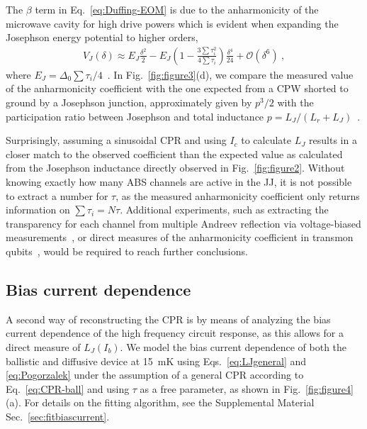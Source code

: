 The $\beta$ term in Eq.~\ref{eq:Duffing-EOM} is due to the anharmonicity of the microwave cavity for high drive powers which is evident when expanding the Josephson energy potential to higher orders,
\begin{align}
V_J(\delta) \approx E_J \frac{\delta^2}{2} - E_J\left( 1-\frac{3\sum\tau_i^2}{4\sum\tau_i} \right) \frac{\delta^4}{24} +\mathcal{O}(\delta^6)\ , 
\end{align}
%
where $E_J=\Delta_0\sum\tau_i/4$~\cite{kringhojAnharmonicitySuperconductingQubit2018}.
%
In Fig.~\ref{fig:figure3}(d), we compare the measured value of the anharmonicity coefficient with the one expected from a CPW shorted to ground by a Josephson junction, approximately given by $p^3/2$ with the participation ratio between Josephson and total inductance $p=L_J/(L_r+L_J)$~\cite{wilsonPhotonGenerationElectromagnetic2010b,zhouHighgainWeaklyNonlinear2014}.



Surprisingly, assuming a sinusoidal CPR and using $I_c$ to calculate $L_J$ results in a closer match to the observed coefficient than the expected value as calculated from the Josephson inductance directly observed in Fig.~\ref{fig:figure2}.
%
Without knowing exactly how many ABS channels are active in the JJ, it is not possible to extract a number for $\tau$, as the measured anharmonicity coefficient only returns information on $\sum\tau_i=N\tau$.
%
Additional experiments, such as extracting the transparency for each channel from multiple Andreev reflection via voltage-biased measurements~\cite{scheerConductionChannelTransmissions1997,goffmanConductionChannelsInAsAl2017,bretheauTunnellingSpectroscopyAndreev2017a,pandeyAndreevReflectionBallistic2019}, or direct measures of the anharmonicity coefficient in transmon qubits~\cite{larsenSemiconductorNanowireBasedSuperconductingQubit2015, delangeRealizationMicrowaveQuantum2015, casparisGatemonBenchmarkingTwoQubit2016a,casparisSuperconductingGatemonQubit2018}, would be required to reach further conclusions.


\subsection{Bias current dependence}

A second way of reconstructing the CPR is by means of analyzing the bias current dependence of the high frequency circuit response, as this allows for a direct measure of $L_J(I_b)$.
%
We model the bias current dependence of both the ballistic and diffusive device at \SI{15}{\milli\kelvin} using Eqs.~\ref{eq:LJgeneral} and \ref{eq:Pogorzalek} under the assumption of a general CPR according to Eq.~\ref{eq:CPR-ball} and using $\tau$ as a free parameter, as shown in Fig.~\ref{fig:figure4}(a).
%
For details on the fitting algorithm, see the Supplemental Material Sec.~\ref{sec:fitbiascurrent}.

